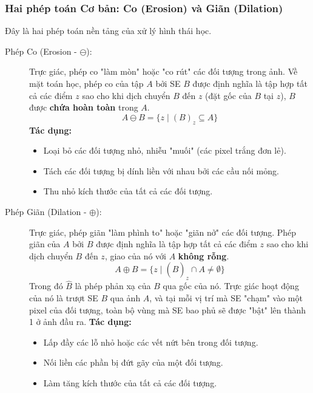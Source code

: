 \subsubsection{Hai phép toán Cơ bản: Co (Erosion) và Giãn (Dilation)}
\label{subsubsec:erosion_dilation}
Đây là hai phép toán nền tảng của xử lý hình thái học.

\begin{description}
    \item[Phép Co (Erosion - $\ominus$):] Trực giác, phép co "làm mòn" hoặc "co rút" các đối tượng trong ảnh. Về mặt toán học, phép co của tập $A$ bởi SE $B$ được định nghĩa là tập hợp tất cả các điểm $z$ sao cho khi dịch chuyển $B$ đến $z$ (đặt gốc của $B$ tại $z$), $B$ được \textbf{chứa hoàn toàn} trong $A$.
    \begin{equation}
        A \ominus B = \{ z \mid (B)_z \subseteq A \}
    \end{equation}
    \textbf{Tác dụng:}
    \begin{itemize}
        \item Loại bỏ các đối tượng nhỏ, nhiễu "muối" (các pixel trắng đơn lẻ).
        \item Tách các đối tượng bị dính liền với nhau bởi các cầu nối mỏng.
        \item Thu nhỏ kích thước của tất cả các đối tượng.
    \end{itemize}
    
    \item[Phép Giãn (Dilation - $\oplus$):] Trực giác, phép giãn "làm phình to" hoặc "giãn nở" các đối tượng. Phép giãn của $A$ bởi $B$ được định nghĩa là tập hợp tất cả các điểm $z$ sao cho khi dịch chuyển $B$ đến $z$, giao của nó với $A$ \textbf{không rỗng}.
    \begin{equation}
        A \oplus B = \{ z \mid (\hat{B})_z \cap A \neq \emptyset \}
    \end{equation}
    Trong đó $\hat{B}$ là phép phản xạ của $B$ qua gốc của nó. Trực giác hoạt động của nó là trượt SE $B$ qua ảnh $A$, và tại mỗi vị trí mà SE "chạm" vào một pixel của đối tượng, toàn bộ vùng mà SE bao phủ sẽ được "bật" lên thành 1 ở ảnh đầu ra.
    \textbf{Tác dụng:}
    \begin{itemize}
        \item Lấp đầy các lỗ nhỏ hoặc các vết nứt bên trong đối tượng.
        \item Nối liền các phần bị đứt gãy của một đối tượng.
        \item Làm tăng kích thước của tất cả các đối tượng.
    \end{itemize}
\end{description}

